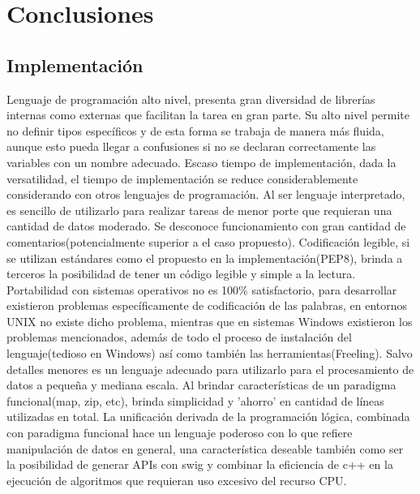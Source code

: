 \documentclass[12pt]{article}
\begin{document}
\section{Conclusiones}\label{conclusions}
\subsection{Implementación}
Lenguaje de programación alto nivel, presenta gran diversidad de librerías internas como externas que facilitan la tarea en gran parte. Su alto nivel permite no definir tipos específicos y de esta forma se trabaja de manera más fluida, aunque esto pueda llegar a confusiones si no se declaran correctamente las variables con un nombre adecuado.
Escaso tiempo de implementación, dada la versatilidad, el tiempo de implementación se reduce considerablemente considerando con otros lenguajes de programación.
Al ser lenguaje interpretado, es sencillo de utilizarlo para realizar tareas de menor porte que requieran una cantidad de datos moderado. Se desconoce funcionamiento con gran cantidad de comentarios(potencialmente superior a el caso propuesto).
Codificación legible, si se utilizan estándares como el propuesto en la implementación(PEP8), brinda a terceros la posibilidad de tener un código legible y simple a la lectura.
Portabilidad con sistemas operativos no es 100\% satisfactorio, para desarrollar existieron problemas específicamente de codificación de las palabras, en entornos UNIX no existe dicho problema, mientras que en sistemas Windows existieron los problemas mencionados, además de todo el proceso de instalación del lenguaje(tedioso en Windows) así como también las herramientas(Freeling).
Salvo detalles menores es un lenguaje adecuado para utilizarlo para el procesamiento de datos a pequeña y mediana escala.
Al brindar características de un paradigma funcional(map, zip, etc), brinda simplicidad y 'ahorro' en cantidad de líneas utilizadas en total.
La unificación derivada de la programación lógica, combinada con paradigma funcional hace un lenguaje poderoso con lo que refiere manipulación de datos en general, una característica deseable también como  ser la posibilidad de generar APIs con swig y combinar la eficiencia de c++ en la ejecución de algoritmos que requieran uso excesivo del recurso CPU. 

%
%
\end{document}
